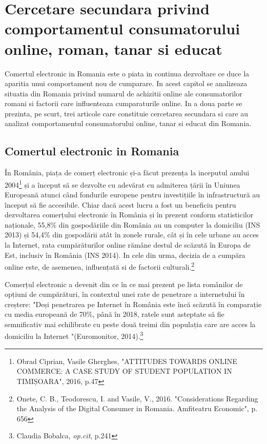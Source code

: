 \documentclass[a4paper, 12pt]{article}
\begin{document}
	\newpage
	\section{Cercetare secundara privind comportamentul consumatorului online, roman, tanar si educat}
	
	\quad\quad Comertul electronic in Romania este o piata in continua dezvoltare ce duce la aparitia unui comportament nou de cumparare. In acest capitol se analizeaza situatia din Romania privind numarul de achizitii online ale consumatorilor romani si factorii care influenteaza cumparaturile online. In a doua parte se prezinta, pe scurt, trei articole care constituie cercetarea secundara si care au analizat comportamentul consumatorului online, tanar si educat din Romania.
	
	\subsection{Comertul electronic in Romania}
	\qquad  În România, piața de comerț electronic și-a făcut prezența la inceputul anului 2004\footnote{Obrad Ciprian, Vasile Gherghes, "ATTITUDES TOWARDS ONLINE COMMERCE: A CASE STUDY OF STUDENT POPULATION IN TIMIȘOARA", 2016, p.47} și a început să se dezvolte cu adevărat cu admiterea țării în Uniunea Europeană atunci când fondurile europene pentru investițiile în infrastructură au început să fie accesibile. Chiar dacă acest lucru a fost un beneficiu pentru dezvoltarea comerțului electronic în România și în prezent conform statisticilor naționale, 55,8\% din gospodăriile din România au un computer la domiciliu (INS 2013) și 54,4\% din gospodării atât în zonele rurale, cât și în cele urbane au acces la Internet, rata cumpărăturilor online rămâne destul de scăzută în Europa de Est, inclusiv în România (INS 2014). In cele din urma, decizia de a cumpăra online este, de asemenea, influențată si de factorii culturali.\footnote{Onete, C. B., Teodorescu, I. and Vasile, V., 2016. "Considerations Regarding the Analysis of the Digital Consumer in Romania. Amfiteatru Economic", p. 656}
	
	\qquad Comerțul electronic a devenit din ce în ce mai prezent pe lista românilor de opțiuni de cumpărături, în contextul unei rate de penetrare a internetului în creștere: "Deși penetrarea pe Internet în România este încă scăzută în comparație cu media europeană de 70\%, până în 2018, ratele sunt asteptate să fie semnificativ mai echilibrate cu peste două treimi din populația care are acces la domiciliu la Internet "(Euromonitor, 2014).\footnote{Claudia Bobalca, \textit{op.cit}, p.241}
	
\end{document}
